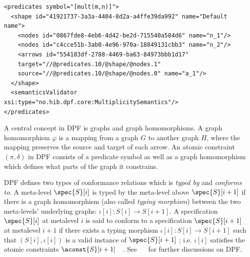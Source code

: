 \lstset{language=xml,caption=A predicate for a multiplicity constraint.,label=list:multconstraint,captionpos=b}
\begin{table}[ht]
  \centering
  \begin{lstlisting}[showstringspaces=false]
<predicates symbol="[mult(m,n)]">
  <shape id="41921737-3a3a-4404-8d2a-a4ffe39da992" name="Default name">
    <nodes id="0867fde8-4eb6-4d42-be2d-715540a584d6" name="n_1"/>
    <nodes id="c4cce51b-3ab0-4e96-970a-18849131cbb3" name="n_2"/>
    <arrows id="554183df-2788-4469-ba63-84973bbb1d17" 
	target="//@predicates.10/@shape/@nodes.1" 
	source="//@predicates.10/@shape/@nodes.0" name="a_1"/>
  </shape>
  <semanticsValidator xsi:type="no.hib.dpf.core:MultiplicitySemantics"/>
</predicates>
  \end{lstlisting}
\end{table}

A central concept in DPF is graphs and graph homomorphisms. A graph homomorphism $\varphi$ is a mapping from a graph $G$ to another graph $H$, where the mapping preserves the source and target of each arrow. An atomic constraint $(\pi, \delta)$ in DPF consists of a predicate symbol as well as a graph homomorphism which defines what parts of the graph it constrains.

DPF defines two types of conformance relations which is \emph{typed by} and \emph{conforms to}. A meta-level $\spec{S}[i]$ is typed by the meta-level above $\spec{S}[i+1]$ if there is a graph homomorphism (also called \emph{typing morphism}) between the two meta-levels' underlying graphs: $\iota[i] : S[i] \rightarrow S[i+1]$. A specification $\spec{S}[i]$ at metalevel $i$ is said to conform to a specification $\spec{S}[i+1]$ at metalevel $i + 1$ if there exists a typing morphism $\iota[i] : S[i] \rightarrow S[i+1]$ such that $(S[i], \iota[i] )$ is a valid instance of $\spec{S}[i+1]$ ; i.e.  $\iota[i]$ satisfies the atomic constraints $\aconst{S}[i+1]$~\cite{dpf_editor_article}~\cite{rutle_thesis_2010}. See ~\cite{rutle_thesis_2010}~\cite{rossini_thesis_2011} for further discussions on DPF.


